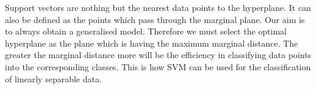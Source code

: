  

 Support vectors are nothing but the nearest data points to the hyperplane. It can also be defined as the points which pass through the marginal plane. Our aim is to always obtain a generalised model. Therefore we must select the optimal hyperplane as the plane which is having the maximum marginal distance. The greater the marginal distance more will be the efficiency in classifying data points into the corresponding classes. This is how SVM can be used for the classification of linearly separable data.

